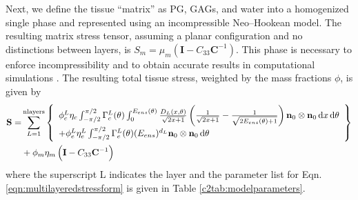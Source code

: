     
    Next, we define the tissue “matrix” as PG, GAGs, and water into a homogenized single phase and represented using an incompressible Neo–Hookean model. The resulting matrix stress tensor, assuming a planar configuration and no distinctions between layers, is $S_m = \mu_m(\mathbf{I} - C_{33}\mathbf{C}^{-1})$. This phase is necessary to enforce incompressibility and to obtain accurate results in computational simulations \cite{fan_simulation_2014}. The resulting total tissue stress, weighted by the mass fractions $\phi$, is given by
        \begin{equation}\label{eqn:multilayeredstressform}
        \begin{aligned}
        \mathbf{S} =& \sum_{L = 1}^\mathrm{n layers} \left\{
        \begin{array}{l}
        \phi_c^L\eta_c\int_{-\pi/2}^{\pi/2}\Gamma_c^L(\theta)\int_0^{E_{ens}(\theta)} \frac{D_L(x,\theta)}{\sqrt{2x+1}}\left( \frac{1}{\sqrt{2x+1}} - \frac{1}{\sqrt{2E_{ens}(\theta)+1}} \right) \mathbf{n}_0\otimes\mathbf{n}_0 \dif x\dif\theta\\
        + \phi_e^L\eta_e^L\int_{-\pi/2}^{\pi/2}\Gamma_e^L(\theta)(E_{ens})^{d_L} \mathbf{n}_0\otimes\mathbf{n}_0 \dif\theta
        \end{array}
        \right\}    \\
        &+ \phi_m\eta_m\left(\mathbf{I} - C_{33}\mathbf{C}^{-1}\right)
        \end{aligned}
        \end{equation}
    where the superscript L indicates the layer and the parameter list for Eqn. \ref{eqn:multilayeredstressform} is given in Table \ref{c2tab:modelparameters}.


